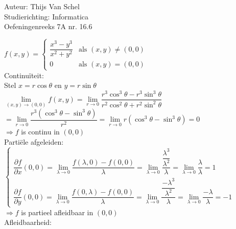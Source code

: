 \documentclass[a4paper]{article}
\newcommand{\dlim}{\lim\limits}
\begin{document}
  
\noindent \large Auteur: Thijs Van Schel \\
\noindent \large Studierichting: Informatica\\
\noindent \large Oefeningenreeks 7A nr. 16.6\\

\medskip

\normalsize

$f(x,y) = 
\left\{ 
\begin{array}{ll} 
\dfrac{x^3-y^3}{x^2+y^2} & \text{als } (x,y) \neq (0,0)\\ 
0 & \text{als } (x,y) = (0,0) 
\end{array} 
\right.$ \\

Continuïteit:\\

Stel $x = r\cos\theta$ en $y = r \sin \theta$\\

$\dlim_{(x,y)\rightarrow (0,0)} f(x,y) = \dlim_{r\rightarrow 0} \dfrac{r^3 \cos^3 \theta - r^3 \sin^3 \theta}{r^2 \cos^2 \theta + r^2 \sin^2 \theta}$\\

$= \dlim_{r\rightarrow 0} \dfrac{r^3 (\cos^3 \theta - \sin^3 \theta)}{r^2} = \dlim_{r\rightarrow 0} r (\cos^3 \theta - \sin^3 \theta) = 0$ \\

$\Rightarrow f$ is continu in $(0,0)$ \\

Partiële afgeleiden:\\

$\left\{ 
\begin{array}{l} 
\dfrac{\partial f}{\partial x}(0,0) = \dlim_{\lambda \rightarrow 0} \dfrac{f(\lambda,0) - f(0,0)}{\lambda} = \dlim_{\lambda \rightarrow 0} \dfrac{\dfrac{\lambda^3}{\lambda^2}}{\lambda} = \dlim_{\lambda \rightarrow 0} \dfrac{\lambda}{\lambda} = 1 \\ 
\dfrac{\partial f}{\partial y}(0,0) = \dlim_{\lambda \rightarrow 0} \dfrac{f(0,\lambda) - f(0,0)}{\lambda} = \dlim_{\lambda \rightarrow 0} \dfrac{\dfrac{-\lambda^3}{\lambda^2}}{\lambda} = \dlim_{\lambda \rightarrow 0} \dfrac{-\lambda}{\lambda} = -1 
\end{array} 
\right.$ \\

$\Rightarrow f$ is partieel afleidbaar in $(0,0)$\\

Afleidbaarheid:\\
\end{document}
